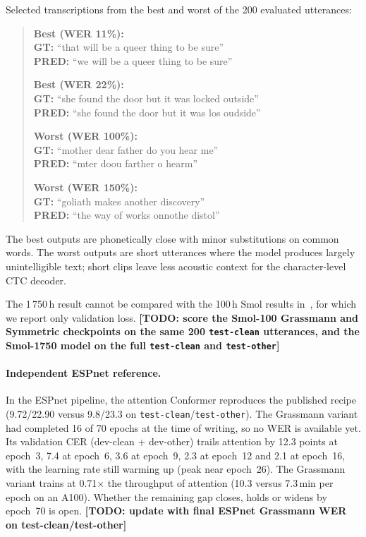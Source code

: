\documentclass[11pt,a4paper]{article}
\newcommand{\TODO}[1]{{\color{red}\textbf{[TODO: #1]}}}
\begin{document}
Selected transcriptions from the best and worst of the 200 evaluated
utterances:
\begin{quote}
\small
\textbf{Best (WER 11\%):} \\
\textbf{GT:} ``that will be a queer thing to be sure'' \\
\textbf{PRED:} ``we will be a queer thing to be sure''

\medskip
\textbf{Best (WER 22\%):} \\
\textbf{GT:} ``she found the door but it was locked outside'' \\
\textbf{PRED:} ``she found the door but it was los oudside''

\medskip
\textbf{Worst (WER 100\%):} \\
\textbf{GT:} ``mother dear father do you hear me'' \\
\textbf{PRED:} ``mter doou farther o hearm''

\medskip
\textbf{Worst (WER 150\%):} \\
\textbf{GT:} ``goliath makes another discovery'' \\
\textbf{PRED:} ``the way of works onnothe distol''
\end{quote}
The best outputs are phonetically close with minor substitutions on
common words.  The worst outputs are short utterances where the model
produces largely unintelligible text; short clips leave less acoustic
context for the character-level CTC decoder.

The 1\,750\,h result cannot be compared with the 100\,h Smol results
in~, for which we report only validation loss.
\TODO{score the Smol-100 Grassmann and Symmetric checkpoints on the
same 200 \texttt{test-clean} utterances, and the Smol-1750 model on the
full \texttt{test-clean} and \texttt{test-other}}

\paragraph{Independent ESPnet reference.}
In the ESPnet pipeline, the attention Conformer reproduces the
published recipe (9.72/22.90 versus 9.8/23.3 on
\texttt{test-clean}/\texttt{test-other}).  The Grassmann variant had
completed 16 of 70 epochs at the time of writing, so no WER is
available yet.  Its validation CER (dev-clean + dev-other) trails
attention by 12.3 points at epoch~3, 7.4 at epoch~6, 3.6 at epoch~9,
2.3 at epoch~12 and 2.1 at epoch~16, with the learning rate still
warming up (peak near epoch~26).  The Grassmann variant trains at
0.71$\times$ the throughput of attention (10.3 versus 7.3\,min per
epoch on an A100).  Whether the remaining gap closes, holds or widens
by epoch~70 is open.  \TODO{update with final ESPnet Grassmann WER on
test-clean/test-other}
\end{document}
